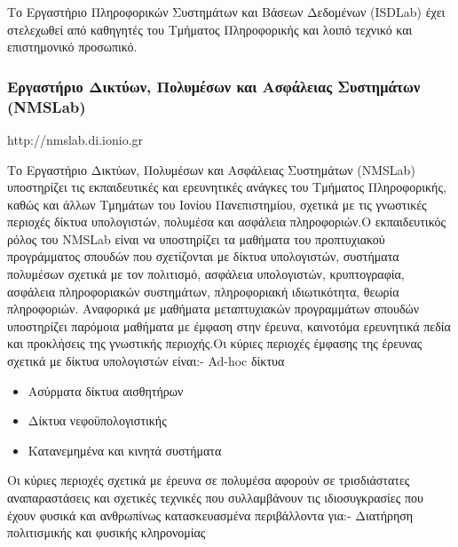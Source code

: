 Το Εργαστήριο Πληροφορικών Συστημάτων και Βάσεων Δεδομένων (ISDLab) έχει
στελεχωθεί από καθηγητές του Τμήματος Πληροφορικής και λοιπό τεχνικό και
επιστημονικό προσωπικό.

\hypertarget{ux3b5ux3c1ux3b3ux3b1ux3c3ux3c4ux3aeux3c1ux3b9ux3bf-ux3b4ux3b9ux3baux3c4ux3cdux3c9ux3bd-ux3c0ux3bfux3bbux3c5ux3bcux3adux3c3ux3c9ux3bd-ux3baux3b1ux3b9-ux3b1ux3c3ux3c6ux3acux3bbux3b5ux3b9ux3b1ux3c2-ux3c3ux3c5ux3c3ux3c4ux3b7ux3bcux3acux3c4ux3c9ux3bd-nmslab}{%
\subsubsection{Εργαστήριο Δικτύων, Πολυμέσων και Ασφάλειας Συστημάτων
(NMSLab)}\label{ux3b5ux3c1ux3b3ux3b1ux3c3ux3c4ux3aeux3c1ux3b9ux3bf-ux3b4ux3b9ux3baux3c4ux3cdux3c9ux3bd-ux3c0ux3bfux3bbux3c5ux3bcux3adux3c3ux3c9ux3bd-ux3baux3b1ux3b9-ux3b1ux3c3ux3c6ux3acux3bbux3b5ux3b9ux3b1ux3c2-ux3c3ux3c5ux3c3ux3c4ux3b7ux3bcux3acux3c4ux3c9ux3bd-nmslab}}

http://nmslab.di.ionio.gr

Το Εργαστήριο Δικτύων, Πολυμέσων και Ασφάλειας Συστημάτων (NMSLab)
υποστηρίζει τις εκπαιδευτικές και ερευνητικές ανάγκες του Τμήματος
Πληροφορικής, καθώς και άλλων Τμημάτων του Ιονίου Πανεπιστημίου, σχετικά
με τις γνωστικές περιοχές δίκτυα υπολογιστών, πολυμέσα και ασφάλεια
πληροφοριών.Ο εκπαιδευτικός ρόλος του NMSLab είναι να υποστηρίζει τα
μαθήματα του προπτυχιακού προγράμματος σπουδών που σχετίζονται με δίκτυα
υπολογιστών, συστήματα πολυμέσων σχετικά με τον πολιτισμό, ασφάλεια
υπολογιστών, κρυπτογραφία, ασφάλεια πληροφοριακών συστημάτων,
πληροφοριακή ιδιωτικότητα, θεωρία πληροφοριών. Αναφορικά με μαθήματα
μεταπτυχιακών προγραμμάτων σπουδών υποστηρίζει παρόμοια μαθήματα με
έμφαση στην έρευνα, καινοτόμα ερευνητικά πεδία και προκλήσεις της
γνωστικής περιοχής.Οι κύριες περιοχές έμφασης της έρευνας σχετικά με
δίκτυα υπολογιστών είναι:- Ad-hoc δίκτυα

\begin{itemize}
\item
  Ασύρματα δίκτυα αισθητήρων
\item
  Δίκτυα νεφοϋπολογιστικής
\item
  Κατανεμημένα και κινητά συστήματα
\end{itemize}

Οι κύριες περιοχές σχετικά με έρευνα σε πολυμέσα αφορούν σε
τρισδιάστατες αναπαραστάσεις και σχετικές τεχνικές που συλλαμβάνουν τις
ιδιοσυγκρασίες που έχουν φυσικά και ανθρωπίνως κατασκευασμένα
περιβάλλοντα για:- Διατήρηση πολιτισμικής και φυσικής κληρονομίας

